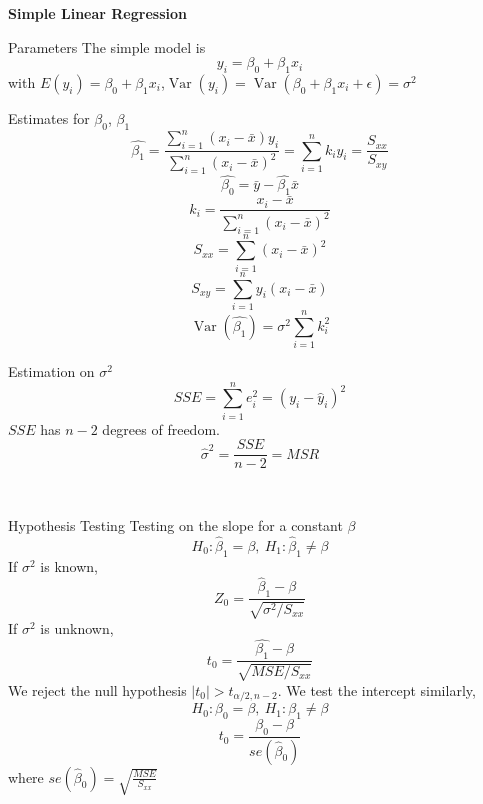 \documentclass{article}
\title{}
\DeclareMathOperator{\Var}{Var}
\begin{document}
\begin{center}{\large{\textbf{Simple Linear Regression}}}\\
\end{center}




\begin{multicols*}{3}

    \begin{blackbox}{Parameters}
        The simple model is \\[-3ex]
        \[y_i = \beta_0 + \beta_1x_i\]
        with $E(y_i) = \beta_0 + \beta_1x_i$,$\Var(y_i) = \Var(\beta_0 + \beta_1x_i + \epsilon) = \sigma^2$
        \begin{redbox}{Estimates for $\beta_0$, $\beta_1$}
            \[\hat{\beta_1}= \frac{\sum_{i=1}^n(x_i - \bar{x})y_i}{\sum_{i=1}^n (x_i - \bar{x})^2} = \sum_{i=1}^n k_iy_i = \frac{S_{xx}}{S_{xy}}\]
            \[\hat{\beta_0} = \bar{y} - \hat{\beta_1}\bar{x}\]
            \[k_i = \frac{x_i - \bar{x}}{\sum_{i=1}^n(x_i - \bar{x})^2}\]
            \[S_{xx} = \sum_{i=1}^n (x_i - \bar{x})^2\]
            \[S_{xy} = \sum_{i=1}^n y_i(x_i - \bar{x})\]
            \[\Var(\hat{\beta_1}) = \sigma^2\sum_{i=1}^nk_i^2\]
        \end{redbox}
        \begin{bluebox}{Estimation on $\sigma^2$}
            \[SSE = \sum_{i=1}^ne_i^2 = (y_i-\hat{y}_i)^2\]
            $SSE$ has $n-2$ degrees of freedom.
            \[\hat{\sigma}^2 = \frac{SSE}{n-2} = MSR\]
        \end{bluebox}\\[-2ex]
    \end{blackbox}
    \begin{blackbox}{Hypothesis Testing}
        Testing on the slope for a constant $\beta$
        \[H_0: \hat{\beta}_1 = \beta, \ H_1: \hat{\beta}_1 \neq \beta\]
        If $\sigma^2$ is known,\\[-4ex]
        \[Z_0 = \frac{\hat{\beta}_1 - \beta}{\sqrt{\sigma^2/S_{xx}}}\]
        If $\sigma^2$ is unknown,\\[-4ex]
        \[t_0 = \frac{\hat{\beta_1} - \beta}{\sqrt{MSE/S_{xx}}}\]
        We reject the null hypothesis $|t_0| > t_{\alpha/2, n-2}$. We test the intercept similarly,\\[-2ex]
        \[H_0: \beta_0 = \beta, \ H_1: \beta_1 \neq \beta\]
        \[t_0 = \frac{\beta_0 -  \beta}{se(\hat{\beta}_0)}\]
        where $se(\hat{\beta}_0) = \sqrt{\frac{MSE}{S_{xx}}}$
    \end{blackbox}

\end{multicols*}
\end{document}
